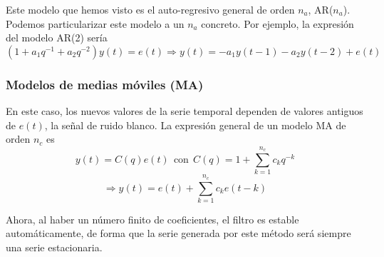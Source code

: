Este modelo que hemos visto es el auto-regresivo general de orden $n_a$, AR($n_a$). Podemos particularizar este modelo a un $n_a$ concreto. Por ejemplo, la expresión del modelo AR(2) sería
\[	(1+a_1q^{-1}+a_2q^{-2})y(t) = e(t) \Rightarrow y(t) = -a_1y(t-1)-a_2y(t-2) + e(t)	\]

\subsubsection{Modelos de medias móviles (MA)}

En este caso, los nuevos valores de la serie temporal dependen de valores antiguos de $e(t)$, la señal de ruido blanco. La expresión general de un modelo MA de orden $n_c$ es
\[ y(t) = C(q)e(t)\ \ \text{con}\ \ C(q) = 1 + \sum_{k=1}^{n_c} c_k q^{-k}	\]
\[ \Rightarrow y(t) = e(t) + \sum_{k=1}^{n_c} c_k e(t-k)	\]

Ahora, al haber un número finito de coeficientes, el filtro es estable automáticamente, de forma que la serie generada por este método será siempre una serie estacionaria.


%